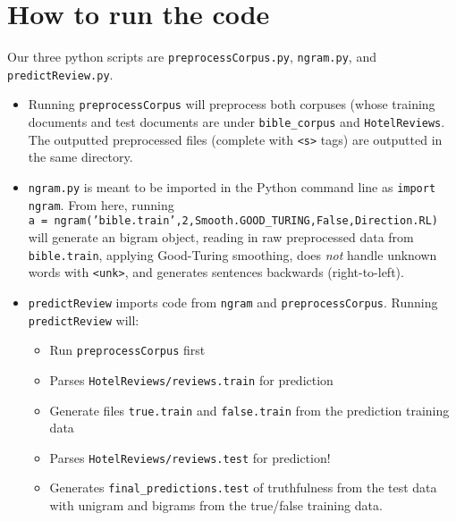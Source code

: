 \documentclass{article}
\begin{document}
\section{How to run the code}
Our three python scripts are \texttt{preprocessCorpus.py}, \texttt{ngram.py}, and \texttt{predictReview.py}.\par
\begin{itemize}[noitemsep]
\item Running \texttt{preprocessCorpus} will preprocess both corpuses (whose training documents and test documents are under \texttt{bible\_corpus} and \texttt{HotelReviews}. The outputted preprocessed files (complete with \texttt{<s>} tags) are outputted in the same directory.
\item \texttt{ngram.py} is meant to be imported in the Python command line as \texttt{import ngram}. From here, running\\
\texttt{a = ngram('bible.train',2,Smooth.GOOD\_TURING,False,Direction.RL)}\\
will generate an bigram object, reading in raw preprocessed data from \texttt{bible.train}, applying Good-Turing smoothing, does \emph{not} handle unknown words with \texttt{<unk>}, and generates sentences backwards (right-to-left).
\item \texttt{predictReview} imports code from \texttt{ngram} and \texttt{preprocessCorpus}. Running \texttt{predictReview} will:
\begin{itemize}[noitemsep,nolistsep]
\item Run \texttt{preprocessCorpus} first
\item Parses \texttt{HotelReviews/reviews.train} for prediction
\item Generate files \texttt{true.train} and \texttt{false.train} from the prediction training data
\item Parses \texttt{HotelReviews/reviews.test} for prediction!
\item Generates \texttt{final\_predictions.test} of truthfulness from the test data with unigram and bigrams from the true/false training data.
\end{itemize}
\end{itemize}
\end{document}
